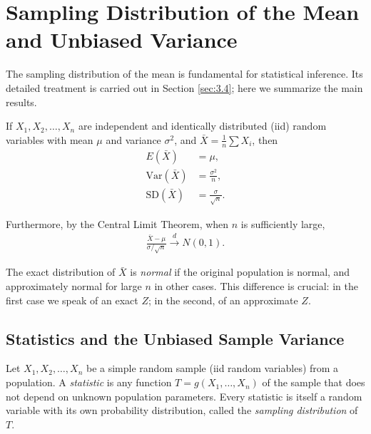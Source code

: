 \section{Sampling Distribution of the Mean and Unbiased Variance}

The sampling distribution of the mean is fundamental for statistical inference. Its detailed treatment is carried out in Section \ref{sec:3.4}; here we summarize the main results.

If $X_1, X_2, \ldots, X_n$ are independent and identically distributed (iid) random variables with mean $\mu$ and variance $\sigma^2$, and $\bar{X} = \frac{1}{n}\sum X_i$, then
\begin{align}
 \label{eq:3.2.7}
 E(\bar{X}) &= \mu, \\
 \label{eq:3.2.8}
 \text{Var}(\bar{X}) &= \frac{\sigma^2}{n}, \\
 \label{eq:3.2.9}
 \text{SD}(\bar{X}) &= \frac{\sigma}{\sqrt{n}}.
\end{align}

Furthermore, by the Central Limit Theorem, when $n$ is sufficiently large,
\begin{align}
 \label{eq:3.2.10}
 \frac{\bar{X} - \mu}{\sigma/\sqrt{n}} \xrightarrow{d} N(0,1).
\end{align}

\begin{observacion}
The exact distribution of $\bar{X}$ is \emph{normal} if the original population is normal, and approximately normal for large $n$ in other cases. This difference is crucial: in the first case we speak of an exact $Z$; in the second, of an approximate $Z$.
\end{observacion}



\subsection{Statistics and the Unbiased Sample Variance}

\begin{definicion}[Statistic]
Let $X_1, X_2, \ldots, X_n$ be a simple random sample (iid random variables) from a population. A \emph{statistic} is any function $T = g(X_1, \ldots, X_n)$ of the sample that does not depend on unknown population parameters. Every statistic is itself a random variable with its own probability distribution, called the \emph{sampling distribution} of $T$.
\end{definicion}

